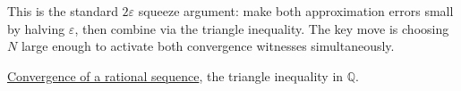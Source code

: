 \begin{remark*}
This is the standard $2\varepsilon$ squeeze argument: make both approximation
errors small by halving $\varepsilon$, then combine via the triangle inequality.
The key move is choosing $N$ large enough to activate both convergence witnesses
simultaneously.
\end{remark*}

\begin{dependencies}
\hyperref[def:convergent-rational-sequence]{Convergence of a rational sequence},
the triangle inequality in $\mathbb{Q}$.
\end{dependencies}

\clearpage
